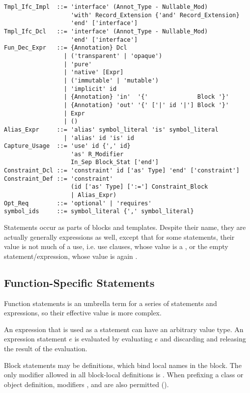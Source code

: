 \begin{lstlisting}
Tmpl_Ifc_Impl  ::= 'interface' (Annot_Type - Nullable_Mod) 
                   'with' Record_Extension {'and' Record_Extension} 
                   'end' ['interface']
Tmpl_Ifc_Dcl   ::= 'interface' (Annot_Type - Nullable_Mod) 
                   'end' ['interface']
Fun_Dec_Expr   ::= {Annotation} Dcl
                 | ('transparent' | 'opaque')
                 | 'pure'
                 | 'native' [Expr]
                 | ('immutable' | 'mutable')
                 | 'implicit' id
                 | {Annotation} 'in'  '{'              Block '}'
                 | {Annotation} 'out' '{' ['|' id '|'] Block '}'
                 | Expr
                 | ()
Alias_Expr     ::= 'alias' symbol_literal 'is' symbol_literal
                 | 'alias' id 'is' id
Capture_Usage  ::= 'use' id {',' id} 
                   'as' R_Modifier
                   In_Sep Block_Stat ['end']
Constraint_Dcl ::= 'constraint' id ['as' Type] 'end' ['constraint']
Constraint_Def ::= 'constraint' 
                   (id ['as' Type] [':='] Constraint_Block 
                   | Alias_Expr)
Opt_Req        ::= 'optional' | 'requires'
symbol_ids     ::= symbol_literal {',' symbol_literal}
\end{lstlisting}

Statements occur as parts of blocks and templates. Despite their name, they are actually generally expressions as well, except that for some statements, their value is not much of a use, i.e. use clauses, whose value is a , or the empty statement/expression, whose value is again . 






\subsection{Function-Specific Statements}

Function statements is an umbrella term for a series of statements and expressions, so their effective value is more complex. 

An expression that is used as a statement can have an arbitrary value type. An expression statement $e$ is evaluated by evaluating $e$ and discarding and releasing the result of the evaluation. 

Block statements may be definitions, which bind local names in the block. The only modifier allowed in all block-local definitions is . When prefixing a class or object definition, modifiers ,  and  are also permitted ().

